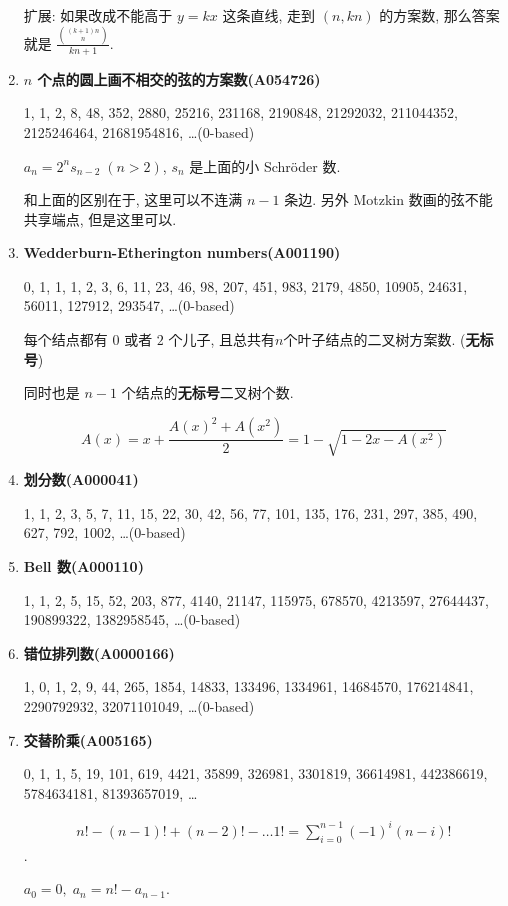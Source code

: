 \begin{enumerate}
扩展: 如果改成不能高于 \(y = kx\) 这条直线, 走到 \((n, kn)\) 的方案数, 那么答案就是 \( \frac {{(k + 1)n \choose n}} {kn + 1} \).

\item \textbf{\(n\) 个点的圆上画不相交的弦的方案数(A054726)}

1, 1, 2, 8, 48, 352, 2880, 25216, 231168, 2190848, 21292032, 211044352, 2125246464, 21681954816, \dots \;(0-based)

\( a_n = 2^n s_{n - 2} \; (n > 2) \), \(s_n\) 是上面的小 Schr\"oder 数.

和上面的区别在于, 这里可以不连满 \(n-1\) 条边. 另外 Motzkin 数画的弦不能共享端点, 但是这里可以.

\item \textbf{Wedderburn-Etherington numbers(A001190)}

0, 1, 1, 1, 2, 3, 6, 11, 23, 46, 98, 207, 451, 983, 2179, 4850, 10905, 24631, 56011, 127912, 293547, \dots \;(0-based)

每个结点都有 \(0\) 或者 \(2\) 个儿子, 且总共有\(n\)个叶子结点的二叉树方案数. (\textbf{无标号})

同时也是 \(n-1\) 个结点的\textbf{无标号}二叉树个数.

\[
    A(x) = x + \frac {A(x) ^ 2 + A(x ^ 2)} 2 = 1 - \sqrt{1 - 2x - A(x ^ 2)}
\]

\item \textbf{划分数(A000041)}

1, 1, 2, 3, 5, 7, 11, 15, 22, 30, 42, 56, 77, 101, 135, 176, 231, 297, 385, 490, 627, 792, 1002, \dots \;(0-based)

\item \textbf{Bell 数(A000110)}

1, 1, 2, 5, 15, 52, 203, 877, 4140, 21147, 115975, 678570, 4213597, 27644437, 190899322, 1382958545, \dots \;(0-based)

\item \textbf{错位排列数(A0000166)}

1, 0, 1, 2, 9, 44, 265, 1854, 14833, 133496, 1334961, 14684570, 176214841, 2290792932, 32071101049, \dots \;(0-based)

\item \textbf{交替阶乘(A005165)}

0, 1, 1, 5, 19, 101, 619, 4421, 35899, 326981, 3301819, 36614981, 442386619, 5784634181, 81393657019, \dots

\[
    \begin{aligned} n! - (n - 1)! + (n - 2)! - \dots 1! = \sum_{i = 0} ^ {n - 1} (-1)^i (n - i)! \end{aligned}
\].

\( a_0 = 0,\; a_n = n! - a_{n - 1} \).

\end{enumerate}

